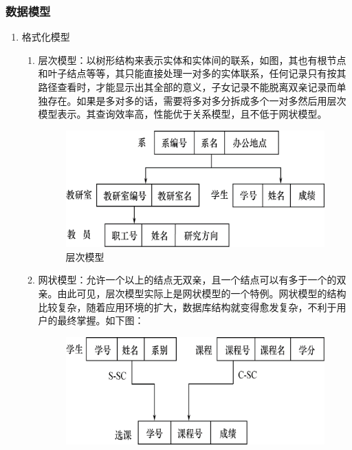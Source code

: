 \documentclass[main.tex]{subfiles}
\begin{document}
\subsubsection{数据模型}
\begin{enumerate}
    \item 格式化模型
        \begin{enumerate}
            \item 层次模型：以树形结构来表示实体和实体间的联系，如图，其也有根节点和叶子结点等等，其只能直接处理一对多的实体联系，任何记录只有按其路径查看时，才能显示出其全部的意义，子女记录不能脱离双亲记录而单独存在。如果是多对多的话，需要将多对多分拆成多个一对多然后用层次模型表示。其查询效率高，性能优于关系模型，且不低于网状模型。
                \begin{figure}[H]
                    \centering
                    \includegraphics[scale=0.5]{./images/0020.png}
                    \caption{层次模型}
                \end{figure}
            \item 网状模型：允许一个以上的结点无双亲，且一个结点可以有多于一个的双亲。由此可见，层次模型实际上是网状模型的一个特例。网状模型的结构比较复杂，随着应用环境的扩大，数据库结构就变得愈发复杂，不利于用户的最终掌握。如下图：
                \begin{figure}[H]
                    \centering
                    \includegraphics[scale=0.5]{./images/0021.png}

\end{figure}
\end{enumerate}
\end{enumerate}
\end{document}
